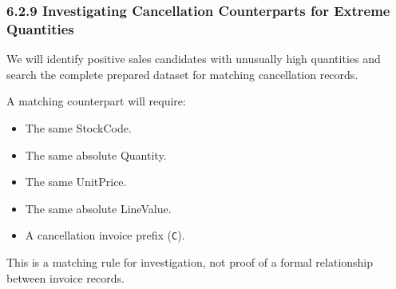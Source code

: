\documentclass[11pt]{article}
\providecommand{\tightlist}{%
      \setlength{\itemsep}{0pt}\setlength{\parskip}{0pt}}
\begin{document}
    
    \subsubsection{6.2.9 Investigating Cancellation Counterparts for Extreme
Quantities}\label{investigating-cancellation-counterparts-for-extreme-quantities}

We will identify positive sales candidates with unusually high
quantities and search the complete prepared dataset for matching
cancellation records.

A matching counterpart will require:

\begin{itemize}
\tightlist
\item
  The same StockCode.
\item
  The same absolute Quantity.
\item
  The same UnitPrice.
\item
  The same absolute LineValue.
\item
  A cancellation invoice prefix (\texttt{C}).
\end{itemize}

This is a matching rule for investigation, not proof of a formal
relationship between invoice records.
\end{document}
